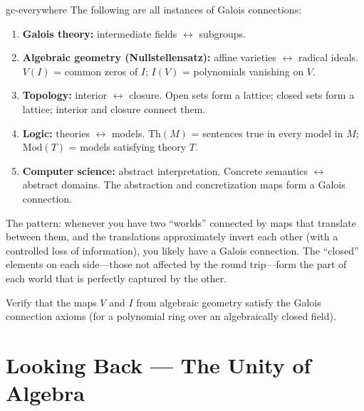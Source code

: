 \documentclass[11pt, a4paper, oneside]{book}
\newcounter{exercise}[chapter]
\begin{document}
\begin{thm}{}{gc-everywhere}
The following are all instances of Galois connections:
\begin{enumerate}[nosep, label=(\roman*)]
\item \textbf{Galois theory:} intermediate fields $\leftrightarrow$ subgroups.
\item \textbf{Algebraic geometry (Nullstellensatz):} affine varieties
  $\leftrightarrow$ radical ideals. $V(I)$ = common zeros of $I$;
  $I(V)$ = polynomials vanishing on $V$.
\item \textbf{Topology:} interior $\leftrightarrow$ closure. Open sets form a
  lattice; closed sets form a lattice; interior and closure connect them.
\item \textbf{Logic:} theories $\leftrightarrow$ models. $\text{Th}(M)$ =
  sentences true in every model in $M$; $\text{Mod}(T)$ = models satisfying theory $T$.
\item \textbf{Computer science:} abstract interpretation. Concrete semantics
  $\leftrightarrow$ abstract domains. The abstraction and concretization maps
  form a Galois connection.
\end{enumerate}
\end{thm}

\begin{intuition}
The pattern: whenever you have two ``worlds'' connected by maps that translate
between them, and the translations approximately invert each other (with a
controlled loss of information), you likely have a Galois connection. The
``closed'' elements on each side---those not affected by the round trip---form
the part of each world that is perfectly captured by the other.
\end{intuition}

\begin{exercisebox}[title={Exercise 15.1}]
Verify that the maps $V$ and $I$ from algebraic geometry satisfy the Galois
connection axioms (for a polynomial ring over an algebraically closed field).
\end{exercisebox}

\chapter{Looking Back --- The Unity of Algebra}
\end{document}
